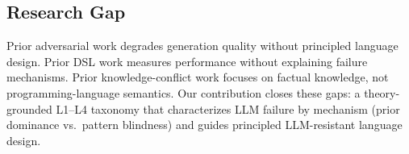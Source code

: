 \subsection{Research Gap}
Prior adversarial work degrades generation quality without principled language design. Prior DSL work measures performance without explaining failure mechanisms. Prior knowledge-conflict work focuses on factual knowledge, not programming-language semantics. Our contribution closes these gaps: a theory-grounded L1--L4 taxonomy that characterizes LLM failure by mechanism (prior dominance vs.\ pattern blindness) and guides principled LLM-resistant language design.

